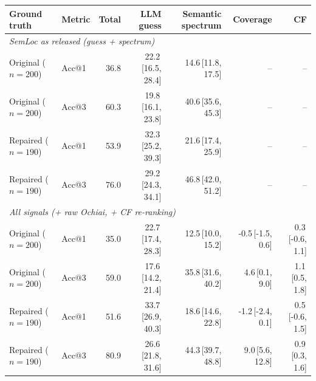 \begin{tabular}{llrrrrr}
\toprule
Ground truth & Metric & Total & LLM guess & Semantic spectrum & Coverage & CF \\
\midrule
\multicolumn{7}{l}{\emph{SemLoc as released (guess + spectrum)}} \\
Original ($n=200$) & Acc@1 & 36.8 & 22.2{\scriptsize\,[16.5, 28.4]} & 14.6{\scriptsize\,[11.8, 17.5]} & -- & -- \\
Original ($n=200$) & Acc@3 & 60.3 & 19.8{\scriptsize\,[16.1, 23.8]} & 40.6{\scriptsize\,[35.6, 45.3]} & -- & -- \\
Repaired ($n=190$) & Acc@1 & 53.9 & 32.3{\scriptsize\,[25.2, 39.3]} & 21.6{\scriptsize\,[17.4, 25.9]} & -- & -- \\
Repaired ($n=190$) & Acc@3 & 76.0 & 29.2{\scriptsize\,[24.3, 34.1]} & 46.8{\scriptsize\,[42.0, 51.2]} & -- & -- \\
\midrule
\multicolumn{7}{l}{\emph{All signals (+ raw Ochiai, + CF re-ranking)}} \\
Original ($n=200$) & Acc@1 & 35.0 & 22.7{\scriptsize\,[17.4, 28.3]} & 12.5{\scriptsize\,[10.0, 15.2]} & -0.5{\scriptsize\,[-1.5, 0.6]} & 0.3{\scriptsize\,[-0.6, 1.1]} \\
Original ($n=200$) & Acc@3 & 59.0 & 17.6{\scriptsize\,[14.2, 21.4]} & 35.8{\scriptsize\,[31.6, 40.2]} & 4.6{\scriptsize\,[0.1, 9.0]} & 1.1{\scriptsize\,[0.5, 1.8]} \\
Repaired ($n=190$) & Acc@1 & 51.6 & 33.7{\scriptsize\,[26.9, 40.3]} & 18.6{\scriptsize\,[14.6, 22.8]} & -1.2{\scriptsize\,[-2.4, 0.1]} & 0.5{\scriptsize\,[-0.6, 1.5]} \\
Repaired ($n=190$) & Acc@3 & 80.9 & 26.6{\scriptsize\,[21.8, 31.6]} & 44.3{\scriptsize\,[39.7, 48.8]} & 9.0{\scriptsize\,[5.6, 12.8]} & 0.9{\scriptsize\,[0.3, 1.6]} \\
\bottomrule
\end{tabular}
